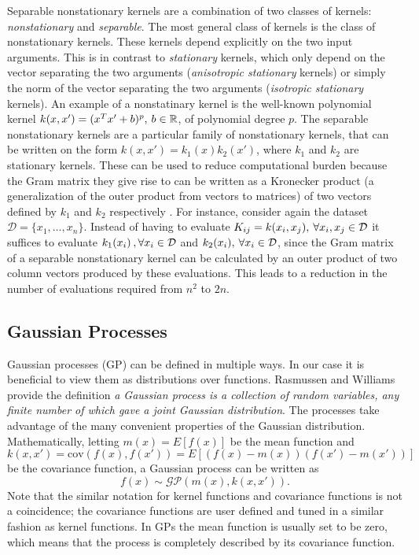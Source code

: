 \documentclass{article}
\theoremstyle{plain}
\theoremstyle{definition}
\theoremstyle{remark}
\begin{document}
Separable nonstationary kernels are a combination of two classes of kernels: \textit{nonstationary} and \textit{separable}. The most general class of kernels is the class of nonstationary kernels. These kernels depend explicitly on the two input arguments. This is in contrast to \textit{stationary} kernels, which only depend on the vector separating the two arguments (\textit{anisotropic stationary} kernels) or simply the norm of the vector separating the two arguments (\textit{isotropic stationary} kernels). An example of a nonstatinary kernel is the well-known polynomial kernel $k(x,x') = (x^Tx' + b)^p, \hspace{0.2em} b \in \mathbb{R}$, of polynomial degree $p$. The separable nonstationary kernels are a particular family of nonstationary kernels, that can be written on the form $k(x,x') = k_1(x)k_2(x')$, where $k_1$ and $k_2$ are stationary kernels. These can be used to reduce computational burden because the Gram matrix they give rise to can be written as a Kronecker product (a generalization of the outer product from vectors to matrices) of two vectors defined by $k_1$ and $k_2$ respectively \cite{genton}. For instance, consider again the dataset $\mathcal{D} = \{x_1, \hdots, x_n\}$. Instead of having to evaluate $K_{ij} = k(x_i, x_j), \hspace{0.2em} \forall x_i,x_j \in \mathcal{D}$ it suffices to evaluate $k_1(x_i) \hspace{0.2em}, \forall x_i \in \mathcal{D}$ and $k_2(x_i), \hspace{0.2em} \forall x_i \in \mathcal{D}$, since the Gram matrix of a separable nonstationary kernel can be calculated by an outer product of two column vectors produced by these evaluations. This leads to a reduction in the number of evaluations required from $n^2$ to $2n$. 

\subsection{Gaussian Processes}
Gaussian processes (GP) can be defined in multiple ways.
In our case it is beneficial to view them as distributions over functions.
Rasmussen and Williams \cite{rasmussen} provide the definition \textit{a Gaussian process is a collection of random variables, any finite number of which gave a joint Gaussian distribution}.
The processes take advantage of the many convenient properties of the Gaussian distribution.
Mathematically, letting $m(x) = E[f(x)]$ be the mean function and $k(x, x') = \text{cov}(f(x), f(x')) =  E[(f(x) - m(x))(f(x') - m(x'))]$ be the covariance function, a Gaussian process can be written as 
\begin{equation*}
        f(x) \sim \mathcal{GP}(m(x), k(x,x')).
\end{equation*}
Note that the similar notation for kernel functions and covariance functions is not a coincidence; the covariance functions are user defined and tuned in a similar fashion as kernel functions.
In GPs the mean function is usually set to be zero, which means that the process is completely described by its covariance function.
\end{document}
